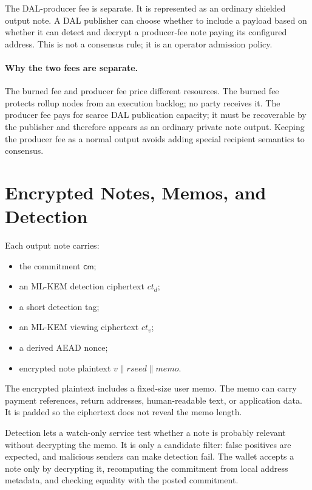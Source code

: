 \documentclass[11pt]{article}
\newcommand{\cm}{\mathsf{cm}}
\begin{document}
The DAL-producer fee is separate. It is represented as an ordinary shielded
output note. A DAL publisher can choose whether to include a payload based on
whether it can detect and decrypt a producer-fee note paying its configured
address. This is not a consensus rule; it is an operator admission policy.

\paragraph{Why the two fees are separate.}
The burned fee and producer fee price different resources. The burned fee
protects rollup nodes from an execution backlog; no party receives it. The
producer fee pays for scarce DAL publication capacity; it must be recoverable by
the publisher and therefore appears as an ordinary private note output. Keeping
the producer fee as a normal output avoids adding special recipient semantics to
consensus.

\section{Encrypted Notes, Memos, and Detection}

Each output note carries:

\begin{itemize}
  \item the commitment \(\cm\);
  \item an ML-KEM detection ciphertext \(ct_d\);
  \item a short detection tag;
  \item an ML-KEM viewing ciphertext \(ct_v\);
  \item a derived AEAD nonce;
  \item encrypted note plaintext \(v \parallel rseed \parallel memo\).
\end{itemize}

The encrypted plaintext includes a fixed-size user memo. The memo can carry
payment references, return addresses, human-readable text, or application data.
It is padded so the ciphertext does not reveal the memo length.

Detection lets a watch-only service test whether a note is probably relevant
without decrypting the memo. It is only a candidate filter: false positives are
expected, and malicious senders can make detection fail. The wallet accepts a
note only by decrypting it, recomputing the commitment from local address
metadata, and checking equality with the posted commitment.
\end{document}
